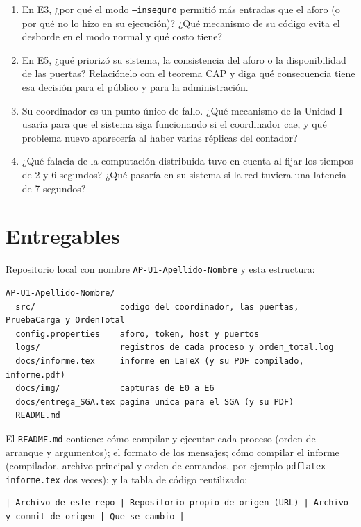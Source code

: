 \documentclass[11pt,a4paper]{article}
\begin{document}
\begin{enumerate}
	\item En E3, ¿por qué el modo \texttt{--inseguro} permitió más entradas que el aforo (o por qué no lo hizo en su ejecución)? ¿Qué mecanismo de su código evita el desborde en el modo normal y qué costo tiene?
	\item En E5, ¿qué priorizó su sistema, la consistencia del aforo o la disponibilidad de las puertas? Relaciónelo con el teorema CAP y diga qué consecuencia tiene esa decisión para el público y para la administración.
	\item Su coordinador es un punto único de fallo. ¿Qué mecanismo de la Unidad I usaría para que el sistema siga funcionando si el coordinador cae, y qué problema nuevo aparecería al haber varias réplicas del contador?
	\item ¿Qué falacia de la computación distribuida tuvo en cuenta al fijar los tiempos de 2 y 6 segundos? ¿Qué pasaría en su sistema si la red tuviera una latencia de 7 segundos?
\end{enumerate}

\section{Entregables}\label{sec:readme}

Repositorio local con nombre \texttt{AP-U1-Apellido-Nombre} y esta estructura:

\begin{lstlisting}
AP-U1-Apellido-Nombre/
  src/                 codigo del coordinador, las puertas, PruebaCarga y OrdenTotal
  config.properties    aforo, token, host y puertos
  logs/                registros de cada proceso y orden_total.log
  docs/informe.tex     informe en LaTeX (y su PDF compilado, informe.pdf)
  docs/img/            capturas de E0 a E6
  docs/entrega_SGA.tex pagina unica para el SGA (y su PDF)
  README.md
\end{lstlisting}

El \texttt{README.md} contiene: cómo compilar y ejecutar cada proceso (orden de arranque y argumentos); el formato de los mensajes; cómo compilar el informe (compilador, archivo principal y orden de comandos, por ejemplo \texttt{pdflatex informe.tex} dos veces); y la tabla de código reutilizado:

\begin{lstlisting}
| Archivo de este repo | Repositorio propio de origen (URL) | Archivo y commit de origen | Que se cambio |
\end{lstlisting}
\end{document}

